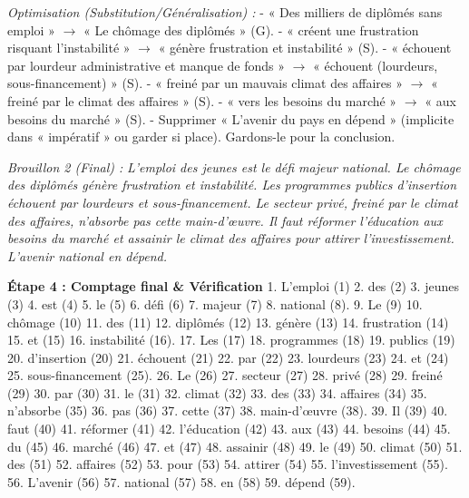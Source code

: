 \documentclass[11pt]{article}
\begin{document}
\begin{exoresolu}
\textit{Optimisation (Substitution/Généralisation) :}
- « Des milliers de diplômés sans emploi » $\rightarrow$ « Le chômage des diplômés » (G).
- « créent une frustration risquant l'instabilité » $\rightarrow$ « génère frustration et instabilité » (S).
- « échouent par lourdeur administrative et manque de fonds » $\rightarrow$ « échouent (lourdeurs, sous-financement) » (S).
- « freiné par un mauvais climat des affaires » $\rightarrow$ « freiné par le climat des affaires » (S).
- « vers les besoins du marché » $\rightarrow$ « aux besoins du marché » (S).
- Supprimer « L'avenir du pays en dépend » (implicite dans « impératif » ou garder si place). Gardons-le pour la conclusion.

\textit{Brouillon 2 (Final) :}
\emph{L'emploi des jeunes est le défi majeur national. Le chômage des diplômés génère frustration et instabilité. Les programmes publics d'insertion échouent par lourdeurs et sous-financement. Le secteur privé, freiné par le climat des affaires, n'absorbe pas cette main-d'œuvre. Il faut réformer l'éducation aux besoins du marché et assainir le climat des affaires pour attirer l'investissement. L'avenir national en dépend.}

\textbf{Étape 4 : Comptage final \& Vérification}
1. L'emploi (1) 2. des (2) 3. jeunes (3) 4. est (4) 5. le (5) 6. défi (6) 7. majeur (7) 8. national (8). 9. Le (9) 10. chômage (10) 11. des (11) 12. diplômés (12) 13. génère (13) 14. frustration (14) 15. et (15) 16. instabilité (16). 17. Les (17) 18. programmes (18) 19. publics (19) 20. d'insertion (20) 21. échouent (21) 22. par (22) 23. lourdeurs (23) 24. et (24) 25. sous-financement (25). 26. Le (26) 27. secteur (27) 28. privé (28) 29. freiné (29) 30. par (30) 31. le (31) 32. climat (32) 33. des (33) 34. affaires (34) 35. n'absorbe (35) 36. pas (36) 37. cette (37) 38. main-d'œuvre (38). 39. Il (39) 40. faut (40) 41. réformer (41) 42. l'éducation (42) 43. aux (43) 44. besoins (44) 45. du (45) 46. marché (46) 47. et (47) 48. assainir (48) 49. le (49) 50. climat (50) 51. des (51) 52. affaires (52) 53. pour (53) 54. attirer (54) 55. l'investissement (55). 56. L'avenir (56) 57. national (57) 58. en (58) 59. dépend (59).


\end{exoresolu}
\end{document}
